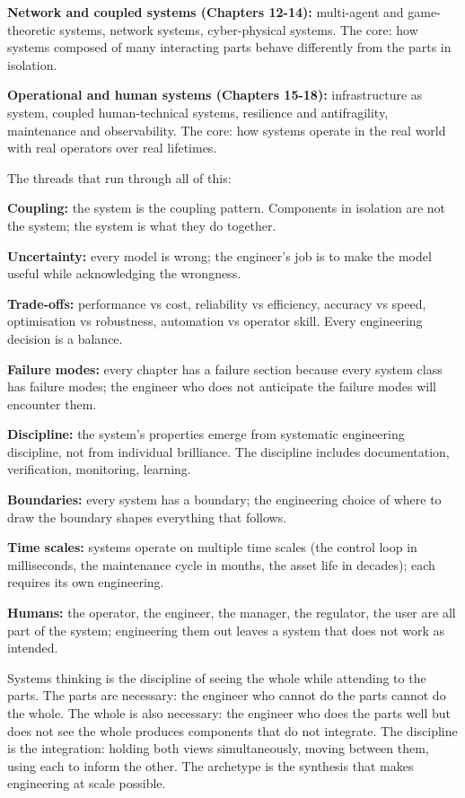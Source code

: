 \textbf{Network and coupled systems (Chapters 12-14):} multi-agent and game-theoretic systems, network systems, cyber-physical systems. The core: how systems composed of many interacting parts behave differently from the parts in isolation.

\textbf{Operational and human systems (Chapters 15-18):} infrastructure as system, coupled human-technical systems, resilience and antifragility, maintenance and observability. The core: how systems operate in the real world with real operators over real lifetimes.

The threads that run through all of this:

\textbf{Coupling:} the system is the coupling pattern. Components in isolation are not the system; the system is what they do together.

\textbf{Uncertainty:} every model is wrong; the engineer's job is to make the model useful while acknowledging the wrongness.

\textbf{Trade-offs:} performance vs cost, reliability vs efficiency, accuracy vs speed, optimisation vs robustness, automation vs operator skill. Every engineering decision is a balance.

\textbf{Failure modes:} every chapter has a failure section because every system class has failure modes; the engineer who does not anticipate the failure modes will encounter them.

\textbf{Discipline:} the system's properties emerge from systematic engineering discipline, not from individual brilliance. The discipline includes documentation, verification, monitoring, learning.

\textbf{Boundaries:} every system has a boundary; the engineering choice of where to draw the boundary shapes everything that follows.

\textbf{Time scales:} systems operate on multiple time scales (the control loop in milliseconds, the maintenance cycle in months, the asset life in decades); each requires its own engineering.

\textbf{Humans:} the operator, the engineer, the manager, the regulator, the user are all part of the system; engineering them out leaves a system that does not work as intended.

\begin{archetype}
Systems thinking is the discipline of seeing the whole while attending to the parts. The parts are necessary: the engineer who cannot do the parts cannot do the whole. The whole is also necessary: the engineer who does the parts well but does not see the whole produces components that do not integrate. The discipline is the integration: holding both views simultaneously, moving between them, using each to inform the other. The archetype is the synthesis that makes engineering at scale possible.
\end{archetype}

